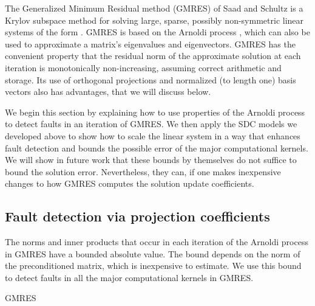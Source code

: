 The Generalized Minimum Residual method (GMRES) of Saad and Schultz
\cite{jje:saad1986gmres} is a Krylov subspace method for solving
large, sparse, possibly non-symmetric linear systems of the form
.
GMRES is based on the Arnoldi process \cite{mfh:arnoldi1951principle}, which
can also be used to approximate a matrix's eigenvalues and
eigenvectors.  GMRES has the convenient property that the residual
norm of the approximate solution at each iteration is monotonically
non-increasing, assuming correct arithmetic and storage.  Its use of
orthogonal projections and normalized (to length one) basis vectors
also has advantages, that we will discuss below.

We begin this section by explaining how to use properties of the
Arnoldi process to detect faults in an iteration of GMRES.  We then
apply the SDC models we developed above to show how to scale the
linear system in a way that enhances fault detection and bounds the
possible error of the major computational kernels.  We will show in
future work that these bounds by themselves do not suffice to bound
the solution error.  Nevertheless, they can, if one makes inexpensive
changes to how GMRES computes the solution update coefficients.

\subsection{Fault detection via projection coefficients}
\label{jje:sec:gmres:hessenberg}


The norms and inner products that occur in each iteration of the
Arnoldi process in GMRES have a bounded absolute value.  
The bound depends on the norm of the preconditioned matrix, which is
inexpensive to estimate.  We use this bound to detect faults in all the major
computational kernels in GMRES.



\begin{algorithm}
\caption{GMRES}
\label{jje:alg:gmres}
\begin{algorithmic}[1]
\State{}
\State{, }
\label{jje:alg:gmres:arnoldi_start}
  \State{}
  \label{jje:alg:gmres:orthog_start_vec}
  \For{}
  \label{jje:alg:gmres:mgs_start}
    \State{}
    \label{jje:alg:gmres:hij}
    \State{}
    \label{jje:alg:gmres:wi}
  \EndFor
  \label{jje:alg:gmres:mgs_end}
  \State{}
  \label{jje:alg:gmres:hjp1}
\If{} \label{jje:alg:gmres:happyCheck}
       \label{jje:alg:GMRES:happy_breakdown}
  \EndIf
\State{}
  \label{jje:alg:gmres:arnoldi_end}
  \State{}
  \State{}
\EndFor
\end{algorithmic}
\end{algorithm}





